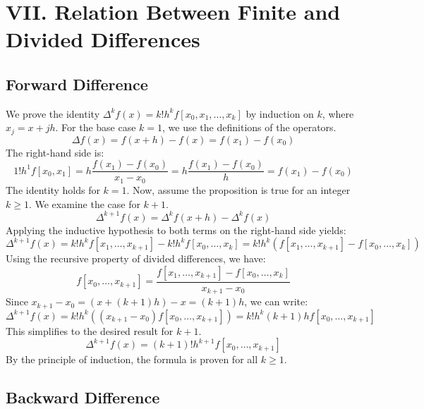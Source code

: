 \documentclass[a4paper]{article}
\begin{document}
\section*{VII. Relation Between Finite and Divided Differences}

\subsection*{Forward Difference}

We prove the identity $\Delta^k f(x) = k!h^k f[x_0, x_1, \dots, x_k]$ by induction on $k$, where $x_j = x+jh$.
For the base case $k=1$, we use the definitions of the operators.
\[
\Delta f(x) = f(x+h) - f(x) = f(x_1) - f(x_0)
\]
The right-hand side is:
\[
1!h^1 f[x_0, x_1] = h \frac{f(x_1)-f(x_0)}{x_1 - x_0} = h \frac{f(x_1)-f(x_0)}{h} = f(x_1)-f(x_0)
\]
The identity holds for $k=1$.
Now, assume the proposition is true for an integer $k \ge 1$. We examine the case for $k+1$.
\[
\Delta^{k+1}f(x) = \Delta^k f(x+h) - \Delta^k f(x)
\]
Applying the inductive hypothesis to both terms on the right-hand side yields:
\[
\Delta^{k+1}f(x) = k!h^k f[x_1, \dots, x_{k+1}] - k!h^k f[x_0, \dots, x_k] = k!h^k \left( f[x_1, \dots, x_{k+1}] - f[x_0, \dots, x_k] \right)
\]
Using the recursive property of divided differences, we have:
\[
f[x_0, \dots, x_{k+1}] = \frac{f[x_1, \dots, x_{k+1}] - f[x_0, \dots, x_k]}{x_{k+1}-x_0}
\]
Since $x_{k+1}-x_0 = (x+(k+1)h) - x = (k+1)h$, we can write:
\[
\Delta^{k+1}f(x) = k!h^k \left( (x_{k+1}-x_0) f[x_0, \dots, x_{k+1}] \right) = k!h^k (k+1)h f[x_0, \dots, x_{k+1}]
\]
This simplifies to the desired result for $k+1$.
\[
\Delta^{k+1}f(x) = (k+1)!h^{k+1}f[x_0, \dots, x_{k+1}]
\]
By the principle of induction, the formula is proven for all $k \ge 1$.

\subsection*{Backward Difference}
\end{document}
